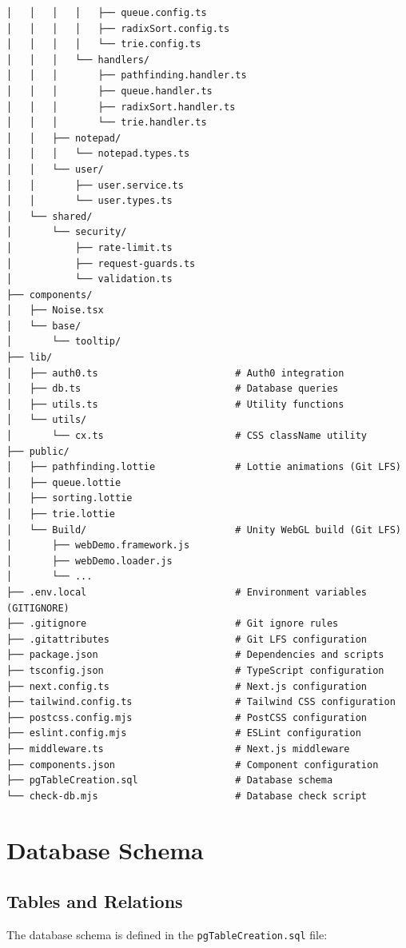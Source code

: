 \begin{verbatim}
│   │   │   │   ├── queue.config.ts
│   │   │   │   ├── radixSort.config.ts
│   │   │   │   └── trie.config.ts
│   │   │   └── handlers/
│   │   │       ├── pathfinding.handler.ts
│   │   │       ├── queue.handler.ts
│   │   │       ├── radixSort.handler.ts
│   │   │       └── trie.handler.ts
│   │   ├── notepad/
│   │   │   └── notepad.types.ts
│   │   └── user/
│   │       ├── user.service.ts
│   │       └── user.types.ts
│   └── shared/
│       └── security/
│           ├── rate-limit.ts
│           ├── request-guards.ts
│           └── validation.ts
├── components/
│   ├── Noise.tsx
│   └── base/
│       └── tooltip/
├── lib/
│   ├── auth0.ts                        # Auth0 integration
│   ├── db.ts                           # Database queries
│   ├── utils.ts                        # Utility functions
│   └── utils/
│       └── cx.ts                       # CSS className utility
├── public/
│   ├── pathfinding.lottie              # Lottie animations (Git LFS)
│   ├── queue.lottie
│   ├── sorting.lottie
│   ├── trie.lottie
│   └── Build/                          # Unity WebGL build (Git LFS)
│       ├── webDemo.framework.js
│       ├── webDemo.loader.js
│       └── ...
├── .env.local                          # Environment variables (GITIGNORE)
├── .gitignore                          # Git ignore rules
├── .gitattributes                      # Git LFS configuration
├── package.json                        # Dependencies and scripts
├── tsconfig.json                       # TypeScript configuration
├── next.config.ts                      # Next.js configuration
├── tailwind.config.ts                  # Tailwind CSS configuration
├── postcss.config.mjs                  # PostCSS configuration
├── eslint.config.mjs                   # ESLint configuration
├── middleware.ts                       # Next.js middleware
├── components.json                     # Component configuration
├── pgTableCreation.sql                 # Database schema
└── check-db.mjs                        # Database check script
\end{verbatim}

\section{Database Schema}

\subsection{Tables and Relations}

The database schema is defined in the \texttt{pgTableCreation.sql} file:

